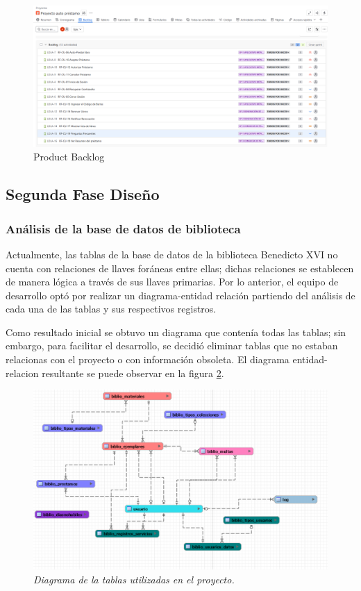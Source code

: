 \documentclass[spanish]{ieee_upb}
\begin{document}
\begin{figure}[H]
    \centering
    \includegraphics[width=1\linewidth]{img/productBacklog.png}
    \caption[Product Backlog]{Product Backlog}
    \label{fig:backlog}
\end{figure}

\subsection{Segunda Fase Diseño}

\subsubsection{Análisis de la base de datos de biblioteca}
Actualmente, las tablas de la base de datos de la biblioteca Benedicto XVI no cuenta con relaciones de llaves foráneas entre ellas; dichas relaciones se establecen de manera lógica a través de sus llaves primarias.  Por lo anterior, el equipo de desarrollo optó por realizar un diagrama-entidad relación partiendo del análisis de cada una de las tablas y sus respectivos registros.
\vspace{0.3 cm}

Como resultado inicial se obtuvo un diagrama que contenía todas las tablas; sin embargo, para facilitar el desarrollo, se decidió eliminar tablas que no estaban relacionas con el proyecto o con información obsoleta. El diagrama entidad-relacion resultante se puede observar en la figura \ref{fig:ERD}.

 \begin{figure}[H] 
	\centering
	\includegraphics[width=0.9\linewidth]{img/diagramaEntidadRelacion.png}
	\vspace{-1mm}
	\caption[Diagrama Entidad-Relación]{\textit{Diagrama de la tablas utilizadas en el proyecto.}}
	\label{fig:ERD} 
\end{figure}
\end{document}
